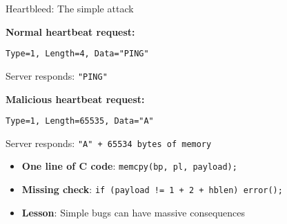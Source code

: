 \documentclass[aspectratio=169, lualatex, handout]{beamer}
\begin{document}
\begin{frame}{Heartbleed: The simple attack}
	\begin{center}
		\textbf{Normal heartbeat request:}
	\end{center}
	\begin{center}
		\texttt{Type=1, Length=4, Data="PING"}
	\end{center}
	\begin{center}
		Server responds: \texttt{"PING"}
	\end{center}
	\pause
	\begin{center}
		\textbf{Malicious heartbeat request:}
	\end{center}
	\begin{center}
		\texttt{Type=1, Length=65535, Data="A"}
	\end{center}
	\begin{center}
		Server responds: \texttt{"A" + 65534 bytes of memory}
	\end{center}
	\pause
	\begin{itemize}[<+->]
		\item \textbf{One line of C code}: \texttt{memcpy(bp, pl, payload);}
		\item \textbf{Missing check}: \texttt{if (payload != 1 + 2 + hblen) error();}
		\item \textbf{Lesson}: Simple bugs can have massive consequences
	\end{itemize}
\end{frame}
\end{document}

